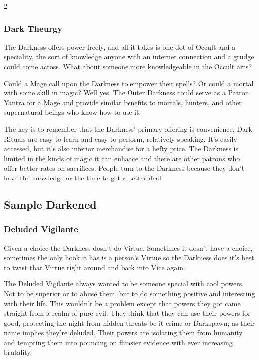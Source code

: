 \begin{multicols}{2}
\begin{mybox}

\subsubsection*{Dark Theurgy}

The Darkness offers power freely, and all it takes is one dot of Occult and a speciality, the sort of knowledge anyone with an internet connection and a grudge could come across. What about someone more knowledgeable in the Occult arts?

Could a Mage call upon the Darkness to empower their spells? Or could a mortal with some skill in magic? Well yes. The Outer Darkness could serve as a Patron Yantra for a Mage and provide similar benefits to mortals, hunters, and other supernatural beings who know how to use it.

The key is to remember that the Darkness' primary offering is convenience. Dark Rituals are easy to learn and easy to perform, relatively speaking. It's easily accessed, but it's also inferior merchandise for a hefty price. The Darkness is limited in the kinds of magic it can enhance and there are other patrons who offer better rates on sacrifices. People turn to the Darkness because they don't have the knowledge or the time to get a better deal. 

\end{mybox}

\subsection*{Sample Darkened}
\label{subsec:SampleDarkened}

\subsubsection*{Deluded Vigilante}

Given a choice the Darkness dosn't do Virtue. Sometimes it dosn't have a choice, sometimes the only hook it has is a person's Virtue so the Darkness does it's best to twist that Virtue right around and back into Vice again.

The Deluded Vigilante always wanted to be someone special with cool powers. Not to be superior or to abuse them, but to do something positive and interesting with their life. This wouldn't be a problem except that powers they got came straight from a realm of pure evil. They think that they can use their powers for good, protecting the night from hidden threats be it crime or Darkspawn; as their name implies they're deluded. Their powers are isolating them from humanity and tempting them into pouncing on flimsier evidence with ever increasing brutality.


\end{multicols}
